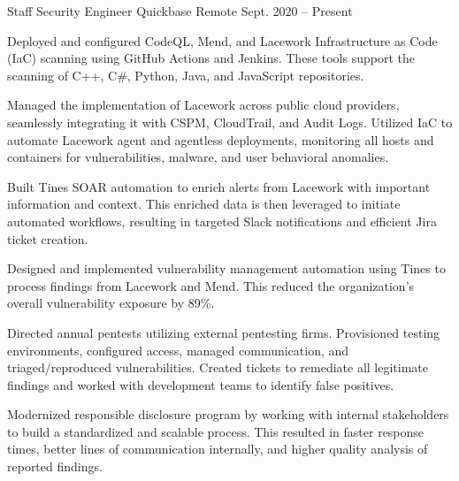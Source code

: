 
\begin{cventries}
\vspace{-3mm}
  \cventry
    {Staff Security Engineer} %
    {Quickbase} %
    {Remote} %
    {Sept. 2020 – Present} %
    {
      \begin{cvitems} %
        \item {
          Deployed and configured CodeQL, Mend, and Lacework Infrastructure as Code (IaC) scanning using GitHub Actions and Jenkins. These tools support the scanning of C++, C\#, Python, Java, and JavaScript repositories.
        }
        \item {
          Managed the implementation of Lacework across public cloud providers, seamlessly integrating it with CSPM, CloudTrail, and Audit Logs. Utilized IaC to automate Lacework agent and agentless deployments, monitoring all hosts and containers for vulnerabilities, malware, and user behavioral anomalies.
        }
        \item {
          Built Tines SOAR automation to enrich alerts from Lacework with important information and context. This enriched data is then leveraged to initiate automated workflows, resulting in targeted Slack notifications and efficient Jira ticket creation.
        }
        \item {
          Designed and implemented vulnerability management automation using Tines to process findings from Lacework and Mend. This reduced the organization's overall vulnerability exposure by 89\%.
        }
        \item {
          Directed annual pentests utilizing external pentesting firms. Provisioned testing environments, configured access, managed communication, and triaged/reproduced vulnerabilities. Created tickets to remediate all legitimate findings and worked with development teams to identify false positives.
        }
        \item {
          Modernized responsible disclosure program by working with internal stakeholders to build a standardized and scalable process. This resulted in faster response times, better lines of communication internally, and higher quality analysis of reported findings.
}
\end{cvitems}}
\end{cventries}
